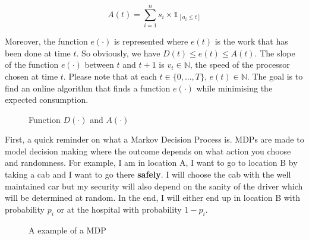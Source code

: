 \documentclass[
10pt, %
a4paper, %
oneside, %
headinclude,footinclude, %
BCOR5mm, %
]{scrartcl}
\newcommand{\N}{\mathbb{N}}
\begin{document}
\begin{equation}
  \label{eq:A}
  A(t) = \sum_{i=1}^ns_i\times\mathbb{1}_{[a_i\leq t]}
\end{equation}

Moreover, the function $e(\cdot)$ is represented
where $e(t)$ is the work that has been done at time $t$. So obviously, we
have $D(t)\leq e(t)\leq A(t)$. The slope of the function
$e(\cdot)$ between $t$ and $t+1$ is $v_t\in\N$, the speed of the
processor chosen at time $t$. Please note that at each
$t\in\{0,\dots,T\}$, $e(t)\in\N$. 
The goal  is to find an online
algorithm that finds a function $e(\cdot)$ while minimising the
expected consumption.\\

\begin{figure}
  \centering
  \caption{Function $D(\cdot)$ and $A(\cdot)$}
  \label{fig:D}
\end{figure}

First, a quick reminder on what a Markov Decision Process is. MDPs are
made to model decision making where the outcome depends on what action
you choose and randomness. For example, I am in location A, I want to
go to location B by taking a cab and I want to go there
\textbf{safely}. I will choose the cab with the well maintained car
but my security will also depend on the sanity of the driver which
will be determined at random. In the end, I will either end up in
location B with probability $p_i$ or at the hospital with probability
$1-p_i$.\\

\begin{figure}
  \centering
 \caption{A example of a MDP}
  \label{fig:mdp}
\end{figure}
\end{document}
